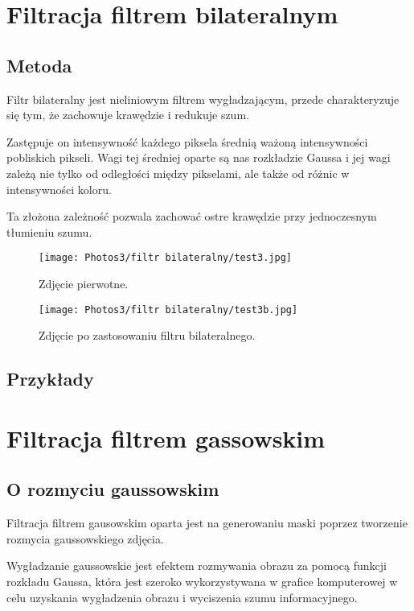 \documentclass[]{mwart}
\begin{document}
\section{Filtracja filtrem bilateralnym         }
\subsection{Metoda}
Filtr bilateralny jest nieliniowym filtrem wygładzającym, przede charakteryzuje się tym,
że zachowuje krawędzie i redukuje szum.

Zastępuje on intensywność każdego
piksela średnią ważoną intensywności pobliskich pikseli.
Wagi tej średniej oparte są nas rozkładzie Gaussa i jej wagi zależą nie tylko od odległości
między pikselami, ale także od różnic w intensywności koloru.

Ta złożona zależność pozwala zachować ostre krawędzie przy jednoczesnym tłumieniu szumu.

\begin{figure}[H]
    \centering
    \texttt{[image: Photos3/filtr bilateralny/test3.jpg]}
    \caption{Zdjęcie pierwotne.}
\end{figure}
\begin{figure}[H]
    \centering
    \texttt{[image: Photos3/filtr bilateralny/test3b.jpg]}
    \caption{Zdjęcie po zastosowaniu filtru bilateralnego.}
\end{figure}



\subsection{Przykłady}



\section{Filtracja filtrem gassowskim           }
\subsection{O rozmyciu gaussowskim}
Filtracja filtrem gausowskim oparta jest na generowaniu maski poprzez tworzenie rozmycia gaussowskiego zdjęcia.

Wygładzanie gaussowskie jest efektem rozmywania obrazu za pomocą funkcji rozkładu Gaussa,
która jest szeroko wykorzystywana w grafice komputerowej w celu uzyskania wygładzenia obrazu i wyciszenia szumu informacyjnego.
\end{document}
